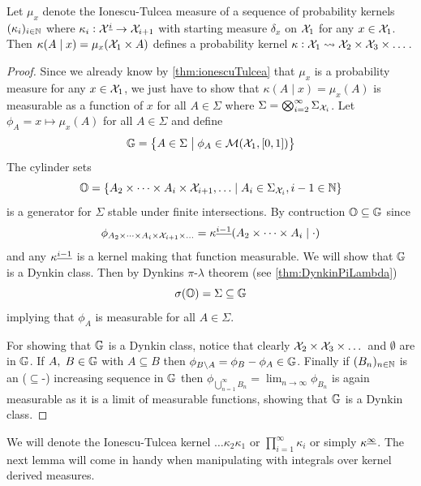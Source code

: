 \begin{prop}
  Let $\mu_x$ denote the Ionescu-Tulcea measure of a
  sequence of probability kernels $(\kappa_i)_{i \in \mathbb{N}}$ where
  $\kappa_i : \mathcal{X}^{\underline{i}} \to \mathcal{X}_{i+1}$
  with starting measure $\delta_x$ on $\mathcal{X}_1$ for any $x \in \mathcal{X}_1$.
  Then $\kappa(A \mid x) = \mu_x(\mathcal{X}_1 \times A)$ defines a probability kernel
  $\kappa : \mathcal{X}_1 \leadsto \mathcal{X}_2 \times \mathcal{X}_3 \times \dots$.
\end{prop}
\begin{proof}
  Since we already know by \cref{thm:ionescuTulcea}
  that $\mu_x$ is a probability measure for any
  $x \in \mathcal{X}_1$,
  we just have to show that $\kappa(A \mid x) = \mu_x(A)$ is measurable
  as a function of $x$ for all
  $A \in \Sigma$ where $\Sigma = \bigotimes_{i=2}^\infty \Sigma_{\mathcal{X}_i}$.
  Let $\phi_A = x \mapsto \mu_x(A)$
  for all $A \in \Sigma$ and define
  \[ \mathbb{G} = \left\{ A \in \Sigma
  \;\middle\vert\; \phi_A \in \mathcal{M}(\mathcal{X}_1, [0,1]) \right\} \]
  The cylinder sets
  \[ \mathbb{O} = \left\{ A_2 \times \dots \times A_i \times \mathcal{X}_{i+1},
  \dots \;\middle\vert\; A_i \in \Sigma_{\mathcal{X}_i}, i-1 \in \mathbb{N} \right\} \]
  is a generator for $\Sigma$ stable under 
  finite intersections.
  By contruction $\mathbb{O} \subseteq \mathbb{G}$ since
  \[ \phi_{A_2 \times \dots \times A_i \times \mathcal{X}_{i+1} \times \dots}
  = \kappa^{\underline{i-1}}(A_2 \times \dots \times A_i \mid \cdot) \]
  and any $\kappa^{\underline{i-1}}$ is a kernel making that function measurable.
  We will show that $\mathbb{G}$ is a Dynkin class.
  Then by Dynkins $\pi$-$\lambda$ theorem (see \cref{thm:DynkinPiLambda})
  \[ \sigma(\mathbb{O}) = \Sigma
  \subseteq \mathbb{G} \]
  implying that $\phi_A$ is measurable
  for all $A \in \Sigma$.
  
  For showing that $\mathbb{G}$ is a Dynkin class, notice that
  clearly $\mathcal{X}_2 \times \mathcal{X}_3 \times \dots$ and $\emptyset$
  are in $\mathbb{G}$.
  If $A,\; B \in \mathbb{G}$ with $A \subseteq B$ then
  $\phi_{B \setminus A} = \phi_B - \phi_A \in \mathbb{G}$.
  Finally if $(B_n)_{n \in \mathbb{N}}$ is an ($\subseteq$-) increasing sequence
  in $\mathbb{G}$ then $\phi_{\bigcup_{n=1}^\infty B_n} =
  \lim_{n \to \infty} \phi_{B_n}$ is again measurable as it is a
  limit of measurable functions, showing that $\mathbb{G}$ is a Dynkin class.
\end{proof}

We will denote the Ionescu-Tulcea kernel $\dots \kappa_2 \kappa_1$ or
$\prod_{i=1}^\infty \kappa_i$ or simply $\kappa^{\underline{\infty}}$.
The next lemma will come in handy when manipulating with integrals over
kernel derived measures.

